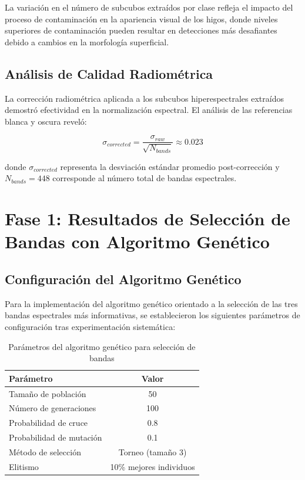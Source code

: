 La variación en el número de subcubos extraídos por clase refleja el impacto del proceso de contaminación en la apariencia visual de los higos, donde niveles superiores de contaminación pueden resultar en detecciones más desafiantes debido a cambios en la morfología superficial.

\subsection{Análisis de Calidad Radiométrica}

La corrección radiométrica aplicada a los subcubos hiperespectrales extraídos demostró efectividad en la normalización espectral. El análisis de las referencias blanca y oscura reveló:

\begin{equation}
\sigma_{corrected} = \frac{\sigma_{raw}}{\sqrt{N_{bands}}} \approx 0.023
\end{equation}

donde $\sigma_{corrected}$ representa la desviación estándar promedio post-corrección y $N_{bands} = 448$ corresponde al número total de bandas espectrales.

\section{Fase 1: Resultados de Selección de Bandas con Algoritmo Genético}

\subsection{Configuración del Algoritmo Genético}

Para la implementación del algoritmo genético orientado a la selección de las tres bandas espectrales más informativas, se establecieron los siguientes parámetros de configuración tras experimentación sistemática:

\begin{table}[h!]
\centering
\caption{Parámetros del algoritmo genético para selección de bandas}
\begin{tabular}{|l|c|}
\hline
\textbf{Parámetro} & \textbf{Valor} \\
\hline
Tamaño de población & 50 \\
\hline
Número de generaciones & 100 \\
\hline
Probabilidad de cruce & 0.8 \\
\hline
Probabilidad de mutación & 0.1 \\
\hline
Método de selección & Torneo (tamaño 3) \\
\hline
Elitismo & 10\% mejores individuos \\
\hline
\end{tabular}
\label{tab:genetic_parameters}
\end{table}

